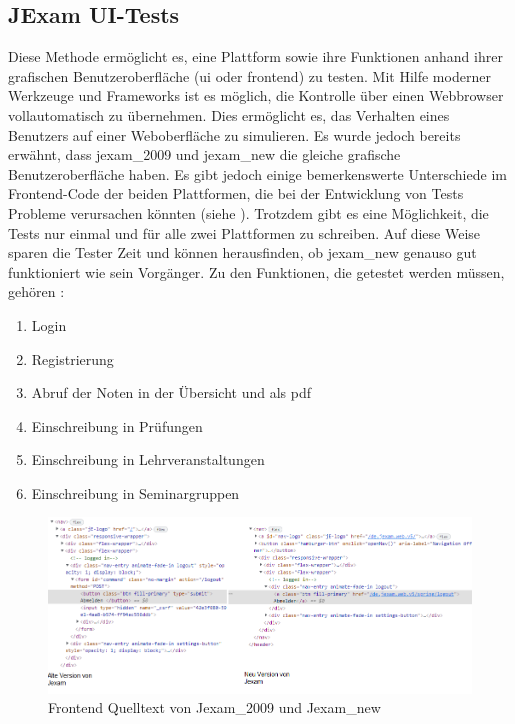 \subsection{JExam UI-Tests}\label{subsec:jexam-ui-tests}

Diese Methode erm\"oglicht es, eine Plattform sowie ihre Funktionen anhand
ihrer grafischen Benutzeroberfl\"ache (\acs{ui} oder \Gls{frontend}) zu
testen. Mit Hilfe moderner Werkzeuge und Frameworks ist es m\"oglich, die
Kontrolle \"uber einen Webbrowser vollautomatisch zu \"ubernehmen. Dies
erm\"oglicht es, das Verhalten eines Benutzers auf einer Weboberfl\"ache zu
simulieren. Es wurde jedoch bereits erw\"ahnt, dass \Gls{jexam_2009} und \Gls{jexam_new}
die gleiche grafische Benutzeroberfl\"ache haben. Es gibt jedoch einige
bemerkenswerte Unterschiede im Frontend-Code der beiden Plattformen,
die bei der Entwicklung von Tests Probleme verursachen k\"onnten
(siehe ). Trotzdem gibt es eine
M\"oglichkeit, die Tests nur einmal und f\"ur alle zwei
Plattformen zu schreiben. Auf diese Weise sparen die Tester Zeit und k\"onnen
herausfinden, ob \Gls{jexam_new} genauso gut funktioniert wie sein Vorg\"anger. Zu den Funktionen, die getestet werden müssen, gehören :
\begin{enumerate}
    \item Login
    \item Registrierung
    \item Abruf der Noten in der Übersicht und als pdf
    \item Einschreibung in Prüfungen
    \item Einschreibung in Lehrveranstaltungen
    \item Einschreibung in Seminargruppen
\end{enumerate}

\noindent
\begin{figure}
    \centering
    \includegraphics[scale=0.6]{images/jexam_compare}
    \caption{Frontend Quelltext von Jexam\_2009 und Jexam\_new} \label{fig:old_new}
\end{figure}

